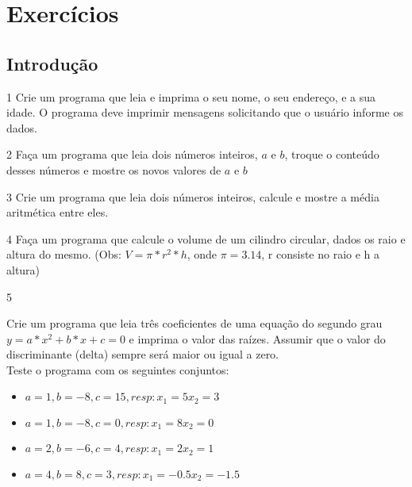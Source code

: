 \chapter{Exercícios}

%


\section{Introdução}
\begin{exercicio}
  {1}
  {Crie um programa que leia e imprima o seu nome, o seu endereço, e a sua idade. O programa deve imprimir mensagens solicitando que o usuário informe os dados.}
\end{exercicio}

\begin{exercicio}
  {2}
  {Faça um programa que leia dois números inteiros, $a$ e $b$, troque o conteúdo desses números e mostre os novos valores de $a$ e $b$}
\end{exercicio}

\begin{exercicio}
  {3}
  {Crie um programa que leia dois números inteiros, calcule e mostre a média aritmética entre eles.}
\end{exercicio}

\begin{exercicio}
  {4}
  {Faça um programa que calcule o volume de um cilindro circular, dados os raio e altura do mesmo. (Obs: $V = \pi * r^2 * h$, onde $\pi=3.14$, r consiste no raio e h a altura)}
\end{exercicio}

\begin{exercicio}
  {5}
  {Crie um programa que leia três coeficientes de uma equação do segundo grau $y=a*x^2 + b*x + c = 0$ e imprima o valor das raízes. Assumir que o valor do discriminante (delta) sempre será maior ou igual a zero. \\
  Teste o programa com os seguintes conjuntos: \\
  \begin{itemize}
    \item $a = 1, b = -8, c = 15, resp: x_{1} = 5 x_{2} = 3$
    \item $a = 1, b = -8, c = 0, resp: x_{1} = 8 x_{2} = 0$
    \item $a = 2, b = -6, c = 4, resp: x_{1} = 2 x_{2} = 1$
    \item $a = 4, b = 8, c = 3, resp: x_{1} = -0.5 x_{2} = -1.5$
  \end{itemize}}
\end{exercicio}

